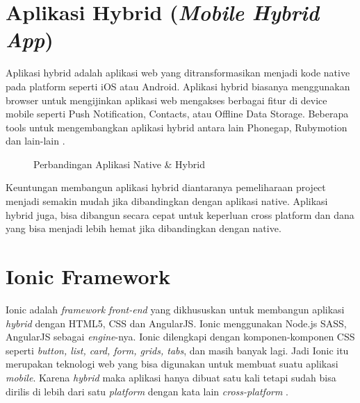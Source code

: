 \section{Aplikasi Hybrid (\textit{Mobile Hybrid App})}
Aplikasi hybrid adalah aplikasi web yang ditransformasikan menjadi kode native pada platform seperti iOS atau Android. Aplikasi hybrid biasanya menggunakan browser untuk mengijinkan aplikasi web mengakses berbagai fitur di device mobile seperti Push Notification, Contacts, atau Offline Data Storage. Beberapa tools untuk mengembangkan aplikasi hybrid antara lain Phonegap, Rubymotion dan lain-lain \textit{\cite{Permana}}.
\begin{figure}[H]
	\centering
	\caption{Perbandingan Aplikasi Native \& Hybrid}
	\label{android}
\end{figure}
\par Keuntungan membangun aplikasi hybrid diantaranya pemeliharaan project menjadi semakin mudah jika dibandingkan dengan aplikasi native. Aplikasi hybrid juga, bisa dibangun secara cepat untuk keperluan cross platform dan dana yang bisa menjadi lebih hemat jika dibandingkan dengan native.


\section{Ionic Framework}

Ionic adalah \textit{framework front-end} yang dikhususkan untuk membangun aplikasi \textit{hybrid} dengan HTML5, CSS dan AngularJS. Ionic menggunakan Node.js SASS, AngularJS sebagai \textit{engine}-nya. Ionic dilengkapi dengan komponen-komponen CSS seperti \textit{button, list, card, form, grids, tabs}, dan masih banyak lagi. Jadi Ionic itu merupakan teknologi web yang bisa digunakan untuk membuat suatu aplikasi \textit{mobile}. Karena \textit{hybrid} maka aplikasi hanya dibuat satu kali tetapi sudah bisa dirilis di lebih dari satu \textit{platform} dengan kata lain \textit{cross-platform} \textit{\cite{Wahyuni}}.


